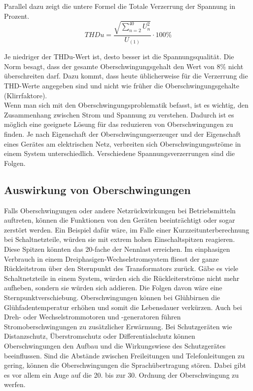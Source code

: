 Parallel dazu zeigt die untere Formel die Totale Verzerrung der Spannung in Prozent.
\begin{equation}\label{eq:THDu}
	THDu = \frac{\sqrt{\sum_{n=2}^{40} U_n^2}}{U_{(1)}} \cdot 100\%
\end{equation}






Je niedriger der THDu-Wert ist, desto besser ist die Spannungsqualität. Die Norm besagt, dass der gesamte Oberschwingungsgehalt den Wert von 8\% nicht überschreiten darf. Dazu kommt, dass heute üblicherweise für die Verzerrung die THD-Werte angegeben sind und nicht wie früher die Oberschwingungsgehalte (Klirrfaktore).\\
Wenn man sich mit den Oberschwingungsproblematik befasst, ist es wichtig, den Zusammenhang zwischen Strom und Spannung zu verstehen. Dadurch ist es möglich eine geeignete Lösung für das reduzieren von Oberschwingungen zu finden. 
Je nach Eigenschaft der Oberschwingungserzeuger und der Eigenschaft eines Gerätes am elektrischen Netz, verbreiten sich Oberschwingungsströme in einem System unterschiedlich. Verschiedene Spannungsverzerrungen sind die Folgen. 

\subsection{Auswirkung von Oberschwingungen}

Falls Oberschwingungen oder andere Netzrückwirkungen bei Betriebsmitteln auftreten, können die Funktionen von den Geräten beeinträchtigt oder sogar zerstört werden. Ein Beispiel dafür wäre, im Falle einer Kurzzeitunterberechnung bei Schaltnetzteile, würden sie mit extrem hohen Einschaltspitzen reagieren. Diese Spitzen könnten das 20-fache der Nennlast erreichen. Im einphasigen Verbrauch in einem Dreiphasigen-Wechselstromsystem fliesst der ganze Rückleitstrom über den Sternpunkt des Transformators zurück. Gäbe es viele Schaltnetzteile in einem System, würden sich die Rückleiterströme nicht mehr aufheben, sondern sie würden sich addieren. Die Folgen davon wäre eine Sternpunktverschiebung. Oberschwingungen können bei Glühbirnen die Glühfadentemperatur erhöhen und somit die Lebensdauer verkürzen. Auch bei Dreh- oder Wechselstrommotoren und -generatoren führen Stromoberschwingungen zu zusätzlicher Erwärmung. Bei Schutzgeräten wie Distanzschutz, Überstromschutz oder Differentialschutz können Oberschwingungen den Aufbau und die Wirkungswiese des Schutzgerätes beeinflussen. Sind die Abstände zwischen Freileitungen und Telefonleitungen zu gering, können die Oberschwingungen die Sprachübertragung stören. Dabei gibt es vor allem ein Auge auf die 20. bis zur 30. Ordnung der Oberschwingung zu werfen.

